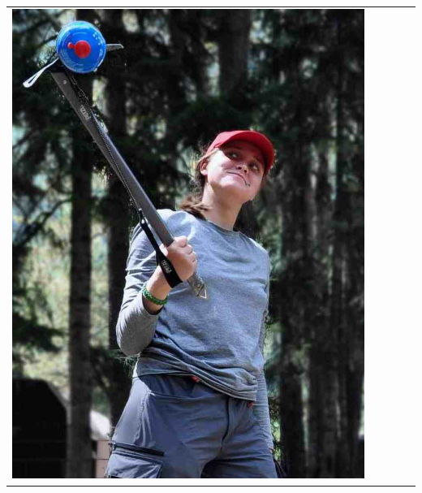 \documentclass[
11pt, %
]{beamer}
\newcommand\rozhasize{0.17\textwidth}
\begin{document}
\begin{frame}
\begin{tabular}{ccccc}
\begin{minipage}{\rozhasize}
		\includegraphics[width=\textwidth]{../pics/portraits/natasha1}
	\end{minipage} &
	\begin{minipage}{\rozhasize}

\end{minipage}
\end{tabular}
\end{frame}
\end{document}
